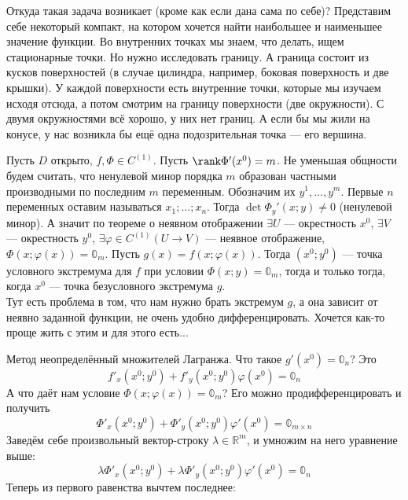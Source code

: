 \documentclass{article}
\begin{document}
\begin{itemize}
\begin{Comment}
            Откуда такая задача возникает (кроме как если дана сама по себе)? Представим себе некоторый компакт, на котором хочется найти наибольшее и наименьшее значение функции. Во внутренних точках мы знаем, что делать, ищем стационарные точки. Но нужно исследовать границу. А граница состоит из кусков поверхностей (в случае цилиндра, например, боковая поверхность и две крышки). У каждой поверхности есть внутренние точки, которые мы изучаем исходя отсюда, а потом смотрим на границу поверхности (две окружности). С двумя окружностями всё хорошо, у них нет границ. А если бы мы жили на конусе, у нас возникла бы ещё одна подозрительная точка --- его вершина.
        \end{Comment}
        \begin{Comment}
            Пусть $D$ открыто, $f,\Phi\in C^{(1)}$. Пусть $\rank\Phi'(x^0)=m$. Не уменьшая общности будем считать, что ненулевой минор порядка $m$ образован частными производными по последним $m$ переменным. Обозначим их $y^1,\ldots,y^m$. Первые $n$ переменных оставим называться $x_1;\ldots;x_n$. Тогда $\det\Phi_y'(x;y)\neq0$ (ненулевой минор). А значит по теореме о неявном отображении $\exists U$ --- окрестность $x^0$, $\exists V$ --- окрестность $y^0$, $\exists\varphi\in C^{(1)}(U\to V)$ --- неявное отображение, $\Phi(x;\varphi(x))=\mathbb0_m$. Пусть $g(x)=f(x;\varphi(x))$. Тогда $(x^0;y^0)$ --- точка условного экстремума для $f$ при условии $\Phi(x;y)=\mathbb0_m$, тогда и только тогда, когда $x^0$ --- точка безусловного экстремума $g$.\\
            Тут есть проблема в том, что нам нужно брать экстремум $g$, а она зависит от неявно заданной функции, не очень удобно дифференцировать. Хочется как-то проще жить с этим и для этого есть...
        \end{Comment}
        \begin{Comment}
            Метод неопределённый множителей Лагранжа. Что такое $g'(x^0)=\mathbb0_n$? Это
            $$
            f'_x(x^0;y^0)+f'_y(x^0;y^0)\varphi(x^0)=\mathbb0_n
            $$
            А что даёт нам условие $\Phi(x;\varphi(x))=\mathbb0_m$? Его можно продифференцировать и получить
            $$
            \Phi'_x(x^0;y^0)+\Phi'_y(x^0;y^0)\varphi'(x^0)=\mathbb0_{m\times n}
            $$
            Заведём себе произвольный вектор-строку $\lambda\in\mathbb R^m$, и умножим на него уравнение выше:
            $$
            \lambda\Phi'_x(x^0;y^0)+\lambda\Phi'_y(x^0;y^0)\varphi'(x^0)=\mathbb0_n
            $$
            Теперь из первого равенства вычтем последнее:
            $$
$$
\end{Comment}
\end{itemize}
\end{document}
